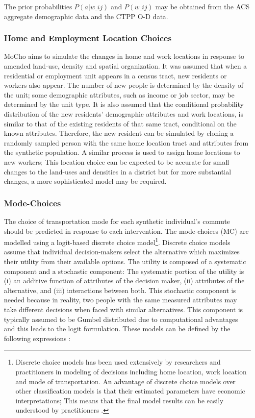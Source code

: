 {{        The prior probabilities $P(a|w\_{ij})$ and $P(w\_{ij})$ may be obtained from the ACS aggregate demographic data and the CTPP O-D data.
    }

    \subsubsection{Home and Employment Location Choices}
    {
        MoCho aims to simulate the changes in home and work locations in response to amended land-use, density and spatial organization. It was assumed that when a residential or employment unit appears in a census tract, new residents or workers also appear. The number of new people is determined by the density of the unit; some demographic attributes, such as income or job sector, may be determined by the unit type. It is also assumed that the conditional probability distribution of the new residents' demographic attributes and work locations, is similar to that of the existing residents of that same tract, conditional on the known attributes. Therefore, the new resident can be simulated by cloning a randomly sampled person with the same home location tract and attributes from the synthetic population. A similar process is used to assign home locations to new workers; This location choice can be expected to be accurate for small changes to the land-uses and densities in a district but for more substantial changes, a more sophisticated model may be required.
    }

    \subsubsection{Mode-Choices}\label{sec:modeChoices}

    {
        The choice of transportation mode for each synthetic individual's commute should be predicted in response to each intervention. The mode-choices (MC) are modelled using a logit-based discrete choice model\footnote{Discrete choice models has been used extensively by researchers and practitioners in modeling of decisions including home location, work location and mode of transportation. An advantage of discrete choice models over other classification models is that their estimated parameters have economic interpretations; This means that the final model results can be easily understood by practitioners \cite{train2009discrete}.}. Discrete choice models assume that individual decision-makers select the alternative which maximizes their utility from their available options.
        \newline
        The utility is composed of a systematic component and a stochastic component: The systematic portion of the utility is (i) an additive function of attributes of the decision maker, (ii) attributes of the alternative, and (iii) interactions between both. This stochastic component is needed because in reality, two people with the same measured attributes may take different decisions when faced with similar alternatives. This component is typically assumed to be Gumbel distributed due to computational advantages and this leads to the logit formulation. These models can be defined by the following expressions \cite{koppelman2006self}:

}}
